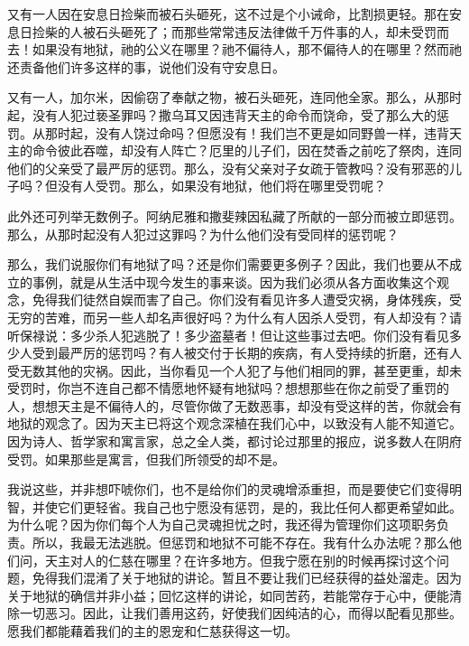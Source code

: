 又有一人因在安息日捡柴而被石头砸死，这不过是个小诫命，比割损更轻。那在安息日捡柴的人被石头砸死了；而那些常常违反法律做千万件事的人，却未受罚而去！如果没有地狱，祂的公义在哪里？祂不偏待人，那不偏待人的在哪里？然而祂还责备他们许多这样的事，说他们没有守安息日。\par

又有一人，加尔米，因偷窃了奉献之物，被石头砸死，连同他全家。那么，从那时起，没有人犯过亵圣罪吗？撒乌耳又因违背天主的命令而饶命，受了那么大的惩罚。从那时起，没有人饶过命吗？但愿没有！我们岂不更是如同野兽一样，违背天主的命令彼此吞噬，却没有人阵亡？厄里的儿子们，因在焚香之前吃了祭肉，连同他们的父亲受了最严厉的惩罚。那么，没有父亲对子女疏于管教吗？没有邪恶的儿子吗？但没有人受罚。那么，如果没有地狱，他们将在哪里受罚呢？\par

此外还可列举无数例子。阿纳尼雅和撒斐辣因私藏了所献的一部分而被立即惩罚。那么，从那时起没有人犯过这罪吗？为什么他们没有受同样的惩罚呢？\par

那么，我们说服你们有地狱了吗？还是你们需要更多例子？因此，我们也要从不成立的事例，就是从生活中现今发生的事来谈。因为我们必须从各方面收集这个观念，免得我们徒然自娱而害了自己。你们没有看见许多人遭受灾祸，身体残疾，受无穷的苦难，而另一些人却名声很好吗？为什么有人因杀人受罚，有人却没有？请听保禄说：多少杀人犯逃脱了！多少盗墓者！但让这些事过去吧。你们没有看见多少人受到最严厉的惩罚吗？有人被交付于长期的疾病，有人受持续的折磨，还有人受无数其他的灾祸。因此，当你看见一个人犯了与他们相同的罪，甚至更重，却未受罚时，你岂不连自己都不情愿地怀疑有地狱吗？想想那些在你之前受了重罚的人，想想天主是不偏待人的，尽管你做了无数恶事，却没有受这样的苦，你就会有地狱的观念了。因为天主已将这个观念深植在我们心中，以致没有人能不知道它。因为诗人、哲学家和寓言家，总之全人类，都讨论过那里的报应，说多数人在阴府受罚。如果那些是寓言，但我们所领受的却不是。\par

我说这些，并非想吓唬你们，也不是给你们的灵魂增添重担，而是要使它们变得明智，并使它们更轻省。我自己也宁愿没有惩罚，是的，我比任何人都更希望如此。为什么呢？因为你们每个人为自己灵魂担忧之时，我还得为管理你们这项职务负责。所以，我最无法逃脱。但惩罚和地狱不可能不存在。我有什么办法呢？那么他们问，天主对人的仁慈在哪里？在许多地方。但我宁愿在别的时候再探讨这个问题，免得我们混淆了关于地狱的讲论。暂且不要让我们已经获得的益处溜走。因为关于地狱的确信并非小益；回忆这样的讲论，如同苦药，若能常存于心中，便能清除一切恶习。因此，让我们善用这药，好使我们因纯洁的心，而得以配看见那些。愿我们都能藉着我们的主的恩宠和仁慈获得这一切。\par

